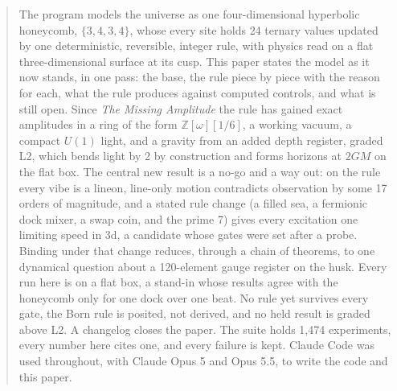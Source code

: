 \begin{abstract}
The program models the universe as one four-dimensional hyperbolic honeycomb, $\{3,4,3,4\}$, whose every site holds
24 ternary values updated by one deterministic, reversible, integer rule, with physics read on a flat
three-dimensional surface at its cusp. This paper states the model as it now stands, in one pass: the base, the rule
piece by piece with the reason for each, what the rule produces against computed controls, and what is still open.
Since \emph{The Missing Amplitude} the rule has gained exact amplitudes in a ring of the form $\mathbb{Z}[\omega][1/6]$,
a working vacuum, a compact $U(1)$ light, and a gravity from an added depth register, graded L2, which bends light by 2
by construction and forms horizons at $2GM$ on the flat box. The central new result is a no-go and a way out: on the
rule every vibe is a lineon, line-only motion contradicts observation by some 17 orders of magnitude, and a stated rule
change (a filled sea, a fermionic dock mixer, a swap coin, and the prime 7) gives every excitation one limiting speed
in 3d, a candidate whose gates were set after a probe. Binding under that change reduces, through a chain of theorems,
to one dynamical question about a 120-element gauge register on the husk. Every run here is on a flat box, a stand-in
whose results agree with the honeycomb only for one dock over one beat. No rule yet survives every gate, the Born rule
is posited, not derived, and no held result is graded above L2. A changelog closes the paper. The suite holds 1,474
experiments, every number here cites one, and every failure is kept. Claude Code was used throughout, with Claude Opus
5 and Opus 5.5, to write the code and this paper.
\end{abstract}
